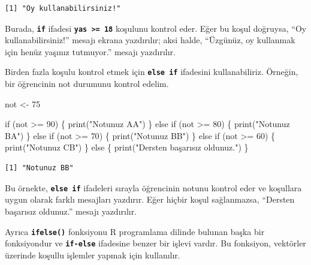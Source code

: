 \documentclass[
  letterpaper,
  DIV=11,
  numbers=noendperiod]{scrreprt}
\newenvironment{Shaded}{\begin{snugshade}}{\end{snugshade}}
\newcommand{\ControlFlowTok}[1]{\textcolor[rgb]{0.00,0.23,0.31}{#1}}
\newcommand{\DecValTok}[1]{\textcolor[rgb]{0.68,0.00,0.00}{#1}}
\newcommand{\FunctionTok}[1]{\textcolor[rgb]{0.28,0.35,0.67}{#1}}
\newcommand{\NormalTok}[1]{\textcolor[rgb]{0.00,0.23,0.31}{#1}}
\newcommand{\OtherTok}[1]{\textcolor[rgb]{0.00,0.23,0.31}{#1}}
\newcommand{\SpecialCharTok}[1]{\textcolor[rgb]{0.37,0.37,0.37}{#1}}
\newcommand{\StringTok}[1]{\textcolor[rgb]{0.13,0.47,0.30}{#1}}
\begin{document}
\begin{verbatim}
[1] "Oy kullanabilirsiniz!"
\end{verbatim}

Burada, \textbf{\texttt{if}} ifadesi
\textbf{\texttt{yas\ \textgreater{}=\ 18}} koşulunu kontrol eder. Eğer
bu koşul doğruysa, ``Oy kullanabilirsiniz!'' mesajı ekrana yazdırılır;
aksi halde, ``Üzgünüz, oy kullanmak için henüz yaşınız tutmuyor.''
mesajı yazdırılır.

Birden fazla koşulu kontrol etmek için \textbf{\texttt{else\ if}}
ifadesini kullanabiliriz. Örneğin, bir öğrencinin not durumunu kontrol
edelim.

\begin{Shaded}
\begin{Highlighting}[]
\NormalTok{not }\OtherTok{\textless{}{-}} \DecValTok{75}

\ControlFlowTok{if}\NormalTok{ (not }\SpecialCharTok{\textgreater{}=} \DecValTok{90}\NormalTok{) \{}
  \FunctionTok{print}\NormalTok{(}\StringTok{"Notunuz AA"}\NormalTok{)}
\NormalTok{\} }\ControlFlowTok{else} \ControlFlowTok{if}\NormalTok{ (not }\SpecialCharTok{\textgreater{}=} \DecValTok{80}\NormalTok{) \{}
  \FunctionTok{print}\NormalTok{(}\StringTok{"Notunuz BA"}\NormalTok{)}
\NormalTok{\} }\ControlFlowTok{else} \ControlFlowTok{if}\NormalTok{ (not }\SpecialCharTok{\textgreater{}=} \DecValTok{70}\NormalTok{) \{}
  \FunctionTok{print}\NormalTok{(}\StringTok{"Notunuz BB"}\NormalTok{)}
\NormalTok{\} }\ControlFlowTok{else} \ControlFlowTok{if}\NormalTok{ (not }\SpecialCharTok{\textgreater{}=} \DecValTok{60}\NormalTok{) \{}
  \FunctionTok{print}\NormalTok{(}\StringTok{"Notunuz CB"}\NormalTok{)}
\NormalTok{\} }\ControlFlowTok{else}\NormalTok{ \{}
  \FunctionTok{print}\NormalTok{(}\StringTok{"Dersten başarısız oldunuz."}\NormalTok{)}
\NormalTok{\}}
\end{Highlighting}
\end{Shaded}

\begin{verbatim}
[1] "Notunuz BB"
\end{verbatim}

Bu örnekte, \textbf{\texttt{else\ if}} ifadeleri sırayla öğrencinin
notunu kontrol eder ve koşullara uygun olarak farklı mesajları yazdırır.
Eğer hiçbir koşul sağlanmazsa, ``Dersten başarısız oldunuz.'' mesajı
yazdırılır.

Ayrıca \textbf{\texttt{ifelse()}} fonksiyonu R programlama dilinde
bulunan başka bir fonksiyondur ve \textbf{\texttt{if-else}} ifadesine
benzer bir işlevi vardır. Bu fonksiyon, vektörler üzerinde koşullu
işlemler yapmak için kullanılır.
\end{document}
